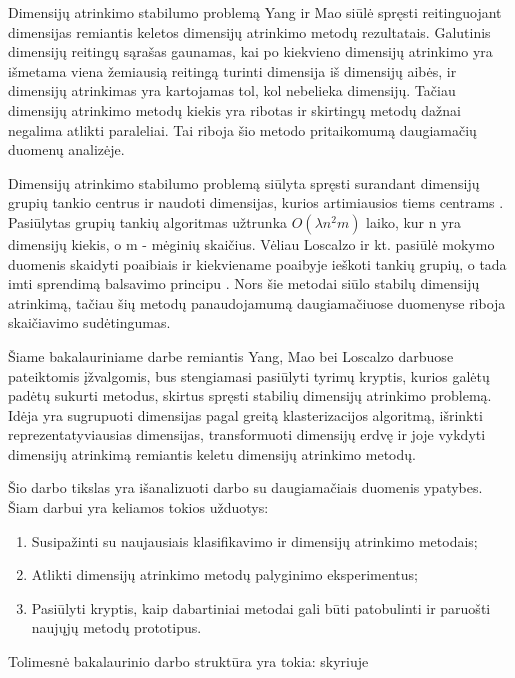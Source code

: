 
Dimensijų atrinkimo stabilumo problemą Yang ir Mao \cite{yang2011robust} siūlė spręsti reitinguojant dimensijas remiantis keletos dimensijų atrinkimo metodų rezultatais. Galutinis dimensijų reitingų sąrašas gaunamas, kai po kiekvieno dimensijų atrinkimo yra išmetama viena žemiausią reitingą turinti dimensija iš dimensijų aibės, ir dimensijų atrinkimas yra kartojamas tol, kol nebelieka dimensijų. Tačiau dimensijų atrinkimo metodų kiekis yra ribotas ir skirtingų metodų dažnai negalima atlikti paraleliai. Tai riboja šio metodo pritaikomumą daugiamačių duomenų analizėje.

Dimensijų atrinkimo stabilumo problemą siūlyta spręsti surandant dimensijų grupių tankio centrus ir naudoti dimensijas, kurios artimiausios tiems centrams \cite{yu2008stable}. Pasiūlytas grupių tankių algoritmas užtrunka $O(\lambda n^2m)$ laiko, kur n yra dimensijų kiekis, o m - mėginių skaičius. Vėliau Loscalzo ir kt. pasiūlė mokymo duomenis skaidyti poaibiais ir kiekviename poaibyje ieškoti tankių grupių, o tada imti sprendimą balsavimo principu \cite{loscalzo2009consensus}. Nors šie metodai siūlo stabilų dimensijų atrinkimą, tačiau šių metodų panaudojamumą daugiamačiuose duomenyse riboja skaičiavimo sudėtingumas.

Šiame bakalauriniame darbe remiantis Yang, Mao bei Loscalzo darbuose pateiktomis įžvalgomis, bus stengiamasi pasiūlyti tyrimų kryptis, kurios galėtų padėtų sukurti metodus, skirtus spręsti stabilių dimensijų atrinkimo problemą. Idėja yra sugrupuoti dimensijas pagal greitą klasterizacijos algoritmą, išrinkti reprezentatyviausias dimensijas, transformuoti dimensijų erdvę ir joje vykdyti dimensijų atrinkimą remiantis keletu dimensijų atrinkimo metodų.

Šio darbo tikslas yra išanalizuoti darbo su daugiamačiais duomenis ypatybes. Šiam darbui yra keliamos tokios užduotys:
\begin{enumerate}
 \item Susipažinti su naujausiais klasifikavimo ir dimensijų atrinkimo metodais;
 \item Atlikti dimensijų atrinkimo metodų palyginimo eksperimentus;
 \item Pasiūlyti kryptis, kaip dabartiniai metodai gali būti patobulinti ir paruošti naujųjų metodų prototipus.
\end{enumerate}

Tolimesnė bakalaurinio darbo struktūra yra tokia: skyriuje

